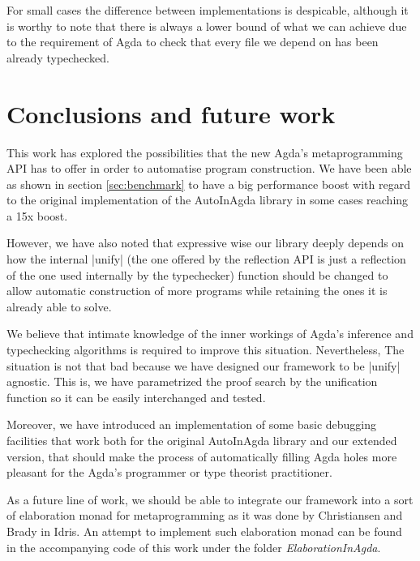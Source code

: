 \documentclass[a4paper]{article}
\begin{document}
For small cases the difference between implementations is despicable, although
it is worthy to note that there is always a lower bound of what we can achieve
due to the requirement of Agda to check that every file we depend on has been
already typechecked.

\section{Conclusions and future work}
\label{sec:conclusions}

This work has explored the possibilities that the new Agda's metaprogramming API
has to offer in order to automatise program construction. We have been able as
shown in section \ref{sec:benchmark} to have a big performance boost with
regard to the original implementation of the AutoInAgda library in some cases
reaching a 15x boost.

However, we have also noted that expressive wise our library deeply depends on
how the internal |unify| (the one offered by the reflection API is just a
reflection of the one used internally by the typechecker) function should be
changed to allow automatic construction of more programs while retaining the
ones it is already able to solve.

We believe that intimate knowledge of the inner workings of Agda's inference and
typechecking algorithms is required to improve this situation. Nevertheless,
The situation is not that bad because we have designed our framework to be
|unify| agnostic. This is, we have parametrized the proof search by the
unification function so it can be easily interchanged and tested.

Moreover, we have introduced an implementation of some basic debugging
facilities that work both for the original AutoInAgda library and our extended
version, that should make the process of automatically filling Agda holes more
pleasant for the Agda's programmer or type theorist practitioner.

As a future line of work, we should be able to integrate our framework into a
sort of elaboration monad for metaprogramming as it was done by Christiansen and
Brady \cite{Christiansen:2016:ERE:2951913.2951932} in Idris. An attempt to
implement such elaboration monad can be found in the accompanying code of this
work under the folder \emph{ElaborationInAgda}.

\appendix



\end{document}
